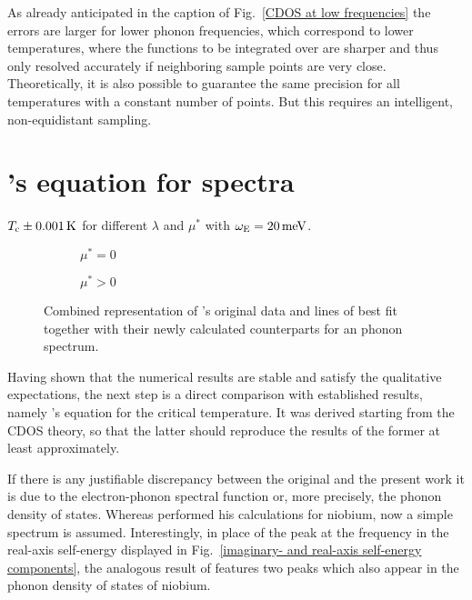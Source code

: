 As already anticipated in the caption of Fig.~\ref{CDOS at low frequencies} the
errors are larger for lower phonon frequencies, which correspond to lower
temperatures, where the  functions to be integrated over are
sharper and thus only resolved accurately if neighboring sample points are very
close. Theoretically, it is also possible to guarantee the same precision for
all temperatures with a constant number of points. But this requires an
intelligent, non-equidistant sampling.

\section{'s equation for  spectra}

\begin{table}
    \centering
    
    \caption{
        $T \sb{\text{c}} \pm 0.001\,\mathrm K$ for different $\lambda$ and $\mu^*$ with
        $\omega \sb{\text{E}} = 20 \, \mathrm{meV}$.}
    \label{Tc table}
\end{table}
%
\begin{figure}
    \small
    \begin{subfigure}{7cm}
        
        \caption{$\mu^* = 0$}
    \end{subfigure}%
    \begin{subfigure}{7cm}
        
        \caption{$\mu^* > 0$}
    \end{subfigure}
    \caption['s fits]{
        Combined representation of 's original data and lines of
        best fit together with their newly calculated counterparts for an
         phonon spectrum.}
    \label{McMillan's fits}
\end{figure}
%
Having shown that the numerical results are stable and satisfy the qualitative
expectations, the next step is a direct comparison with established results,
namely 's equation for the critical temperature. It was derived
starting from the CDOS  theory, so that the latter should
reproduce the results of the former at least approximately.

If there is any justifiable discrepancy between the original and the present
work it is due to the electron-phonon spectral function or, more precisely, the
phonon density of states. Whereas  performed his calculations for
niobium, now a simple  spectrum is assumed. Interestingly, in
place of the peak at the  frequency in the real-axis self-energy
displayed in Fig.~\ref{imaginary- and real-axis self-energy components}, the
analogous result of  \cite[Fig.~4]{McMillan68} features two peaks
which also appear in the phonon density of states of niobium.

